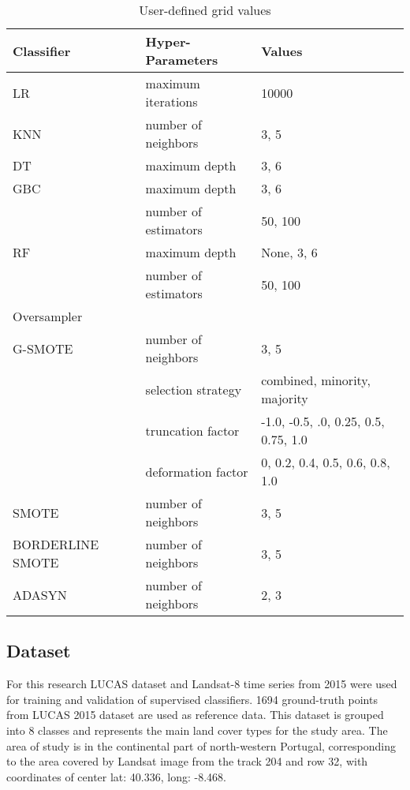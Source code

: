 \documentclass[parskip=full]{scrartcl}
\begin{document}
\begin{table}[H]
	\centering
	\begin{tabular}{lll}
		\toprule
		Classifier       & Hyper-Parameters & Values\\
		\hline
		LR               & maximum iterations   & 10000   \\
		KNN              & number of neighbors  & {3, 5} \\
		DT               & maximum depth        & {3, 6} \\
		GBC              & maximum depth        & {3, 6} \\
    			 		 & number of estimators & {50, 100} \\
		RF               & maximum depth        & {None, 3, 6} \\
				 		 & number of estimators & {50, 100} \\
		\toprule
		Oversampler      &                      & \\
		\hline
		G-SMOTE          & number of neighbors  & {3, 5} \\
				 		 & selection strategy   & combined, minority, majority\\
				 		 & truncation factor    & {-1.0, -0.5, .0, 0.25, 0.5,
				 		 0.75, 1.0} \\
				 		 & deformation factor   & {0, 0.2, 0.4, 0.5, 0.6, 0.8,
				 		 1.0} \\
 		SMOTE            & number of neighbors & {3, 5} \\
		BORDERLINE SMOTE & number of neighbors & {3, 5} \\
		ADASYN           & number of neighbors & {2, 3} \\
		\bottomrule
	\end{tabular}
	\caption{\label{tab:grid}User-defined grid values}
\end{table}


\subsection{Dataset}

For this research LUCAS dataset and Landsat-8 time series from 2015 were used
for training and validation of supervised classifiers. 1694 ground-truth points
from LUCAS 2015 dataset are used as reference data. This dataset is grouped into
8 classes and represents the main land cover types for the study area. The area
of study is in the continental part of north-western Portugal, corresponding to
the area covered by Landsat image from the track 204 and row 32, with
coordinates of center lat: 40.336, long: -8.468.
\end{document}
